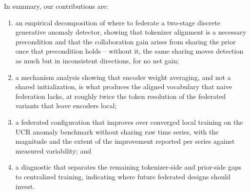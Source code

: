 In summary, our contributions are:

\begin{enumerate}
    \item an empirical decomposition of where to federate a two-stage discrete generative
    anomaly detector, showing that tokenizer alignment is a necessary precondition and that
    the collaboration gain arises from sharing the prior once that precondition holds --
    without it, the same sharing moves detection as much but in inconsistent directions, for
    no net gain;
    \item a mechanism analysis showing that encoder weight averaging, and not a shared
    initialization, is what produces the aligned vocabulary that naive federation lacks, at
    roughly twice the token resolution of the federated variants that leave encoders local;
    \item a federated configuration that improves over converged local training on the UCR
    anomaly benchmark without sharing raw time series, with the magnitude and the extent of
    the improvement reported per series against measured variability; and
    \item a diagnostic that separates the remaining tokenizer-side and prior-side gaps to
    centralized training, indicating where future federated designs should invest.
\end{enumerate}
